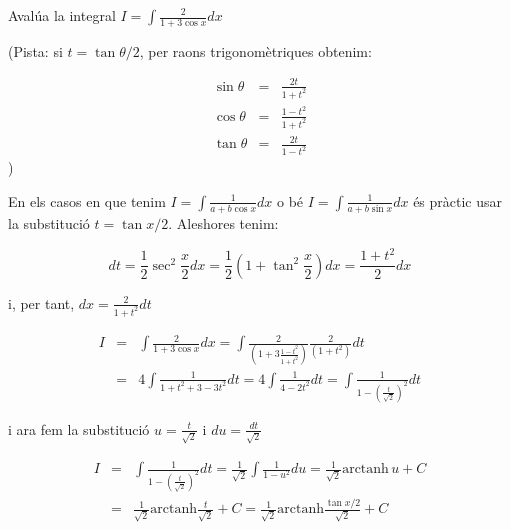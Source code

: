 \Exercise[title={Racional trigonomètrica $\int R(sin x, cos x) dx$}]


Avalúa la integral $I = \int \frac{2}{1+3\cos{x}} dx$

(Pista: si $t = \tan{\theta/2}$, per raons trigonomètriques obtenim:

\begin{eqnarray*} \sin{\theta}&=&\frac{2t}{1+t^2}\\ \cos{\theta}&=&\frac{1-t^2}{1+t^2}\\ \tan{\theta}&=&\frac{2t}{1-t^2} \end{eqnarray*})






\Answer

    En els casos en que tenim \( I = \int \frac{1}{a+b\cos{x}} dx\) o bé \( I = \int \frac{1}{a+b\sin{x}} dx\) és pràctic usar la substitució \(t = \tan{x/2}\). Aleshores tenim:

    $$ dt=\frac{1}{2} \sec^2{\frac{x}{2}} dx = \frac{1}{2} \left( 1+\tan^2{\frac{x}{2}} \right) dx = \frac{1+t^2}{2} dx     $$

    i, per tant, \(dx=\frac{2}{1+t^2} dt\)

    \begin{eqnarray*}
    I &=& \int \frac{2}{1+3\cos{x}} dx = \int \frac{2}{(1+3\frac{1-t^2}{1+t^2})} \frac{2}{(1+t^2)} dt \\
    &=& 4 \int \frac{1}{1+t^2+3-3t^2}  dt =  4 \int \frac{1}{4-2t^2}  dt = \int \frac{1}{1-\left(\frac{t}{\sqrt{2}}\right)^2} dt
    \end{eqnarray*}

    i ara fem la substitució \(u=\frac{t}{\sqrt{2}}\) i \( du = \frac{dt}{\sqrt{2}}\)

    \begin{eqnarray*}
    I &=&  \int \frac{1}{1-\left(\frac{t}{\sqrt{2}}\right)^2} dt = \frac{1}{\sqrt{2}}  \int \frac{1}{1-u^2} du = \frac{1}{\sqrt{2}} \text{arctanh} \, {u} + C \\
    &=& \frac{1}{\sqrt{2}} \text{arctanh} {\frac{t}{\sqrt{2}}} + C =  \frac{1}{\sqrt{2}} \text{arctanh}  {\frac{\tan{x/2}}{\sqrt{2}}} + C
    \end{eqnarray*}

